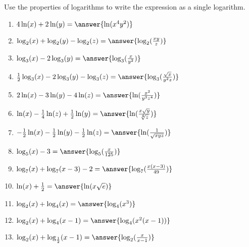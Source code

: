 \documentclass{ximera}
\author{Carl Stitz \and Jeff Zeager \and Bart Snapp \and Matthew Carr}
\begin{document}
\begin{exercise}






Use the properties of logarithms to write the expression as a single
logarithm. 

\begin{enumerate}
	\item $4\ln(x) + 2\ln(y)=\answer{\ln(x^4y^2)}$ 
	
	\item $\log_{2}(x) + \log_{2}(y) - \log_{2}(z)=\answer{\log_{2}(\frac{xy}{z})}$
	
	\item $\log_{3}(x) - 2 \log_{3}(y)=\answer{\log_{3}(\frac{x}{y^2})}$
	
	\item $\frac{1}{2}\log_{3}(x) - 2\log_{3}(y) - \log_{3}(z)=\answer{\log_{3}(\frac{\sqrt{x}}{y^2 z})}$
	
	\item $2 \ln(x) -3 \ln(y) - 4\ln(z)=\answer{\ln(\frac{x^2}{y^3z^4})}$
	
	\item $\ln(x) - \frac{1}{4} \ln(z) + \frac{1}{2} \ln(y)=\answer{\ln(\frac{x\sqrt{y}}{\sqrt[4]{z}})}$
	
	\item $-\frac{1}{2} \ln(x) - \frac{1}{2}\ln(y) - \frac{1}{2} \ln(z)=\answer{\ln(\frac{1}{\sqrt{xyz}})}$
	
	\item $\log_{5}(x) - 3=\answer{\log_{5}(\frac{x}{125})}$
	
	\item $\log_{7}(x) + \log_{7}(x - 3) - 2=\answer{\log_{7}(\frac{x(x-3)}{49})}$
	
	\item $\ln(x) + \frac{1}{2}=\answer{\ln(x\sqrt{e})}$ 
	
	\item $\log_{2}(x) + \log_{4}(x)=\answer{\log_{4}(x^{3})}$ 
	
	\item $\log_{2}(x) + \log_{4}(x-1)=\answer{\log_{4}(x^2(x-1))}$
	
	\item $\log_{2}(x) + \log_{\frac{1}{2}}(x - 1)=\answer{\log_{2}(\frac{x}{x-1})}$ 
\end{enumerate}

\end{exercise}
\end{document}
